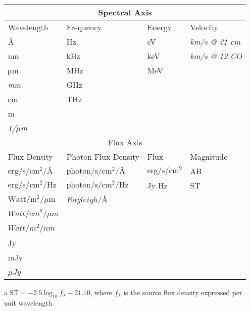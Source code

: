 \begin{threeparttable}
\centering
\begin{tabular}{llll}
    \toprule
    \multicolumn{4}{c}{Spectral Axis} \\
    \midrule
    Wavelength & Frequency & Energy & Velocity \\
    \midrule
    \mbox{\AA} & Hz & eV & \textit{km/s @ 21 cm} \\
    nm & kHz & keV & \textit{km/s @ 12 CO} \\
    $\mathrm{\mu}$m & MHz & MeV & ~ \\
    \textit{mm} & GHz & ~ & ~ \\
    cm & THz & ~ & ~ \\
    m & ~ & ~ & ~ \\
    \textit{1/${\mu}$m} & ~ & ~ & ~ \\
    \midrule
    \multicolumn{4}{c}{Flux Axis} \\
    \midrule
    Flux Density & Photon Flux Density & Flux & Magnitude \\
    \midrule
    $\mathrm{erg}/\mathrm{s}/\mathrm{cm}^{2}/\mbox{\AA}$ & $\mathrm{photon}/\mathrm{s}/\mathrm{cm}^{2}/\mbox{\AA}$ &
		$\mathrm{erg}/\mathrm{s}/\mathrm{cm}^{2}$ & AB \\
	$\mathrm{erg}/\mathrm{s}/\mathrm{cm}^{2}/\mathrm{Hz}$ & $\mathrm{photon}/\mathrm{s}/\mathrm{cm}^{2}/\mathrm{Hz}$ &
		Jy Hz & ST\tnote{a} \\
	$\mathrm{Watt}/\mathrm{m}^{2}/{\mu}\mathrm{m}$ & \textit{$Rayleigh/\mbox{\AA}$} & ~ & ~ \\
	\textit{$Watt/cm^{2}/{\mu}m$} & ~ & ~ & ~ \\
	\textit{$Watt/m^{2}/nm$} & ~ & ~ & ~ \\
	Jy & ~ & ~ & ~ \\
	mJy & ~ & ~ & ~ \\
	\textit{${\mu}$Jy} & ~ & ~ & ~ \\
    \bottomrule
\end{tabular}
\begin{tablenotes}
\item [a] $\mathrm{ST = -2.5~log_{10}}~f_{\lambda} - 21.10$, where $f_{\lambda}$ is
          the source flux density expressed per unit wavelength.
\end{tablenotes}
\end{threeparttable}